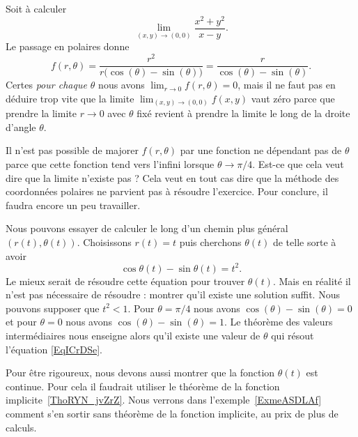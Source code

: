 \begin{example}     \label{EXooSDHDooJzDioW}
	Soit à calculer
	\begin{equation}
		\lim_{(x,y)\to(0,0)}\frac{ x^2+y^2 }{ x-y }.
	\end{equation}
	Le passage en polaires donne
	\begin{equation}
		f(r,\theta)=\frac{ r^2 }{ r\big( \cos(\theta)-\sin(\theta) \big) }=\frac{ r }{ \cos(\theta)-\sin(\theta) }.
	\end{equation}
	Certes \emph{pour chaque $\theta$} nous avons $\lim_{r\to 0} f(r,\theta)=0$, mais il ne faut pas en déduire trop vite que la limite $\lim_{(x,y)\to(0,0)}f(x,y)$ vaut zéro parce que prendre la limite $r\to 0$ avec $\theta$ fixé revient à prendre la limite le long de la droite d'angle $\theta$.

	Il n'est pas possible de majorer $f(r,\theta)$ par une fonction ne dépendant pas de $\theta$ parce que cette fonction tend vers l'infini lorsque $\theta\to\pi/4$. Est-ce que cela veut dire que la limite n'existe pas ? Cela veut en tout cas dire que la méthode des coordonnées polaires ne parvient pas à résoudre l'exercice. Pour conclure, il faudra encore un peu travailler.

    Nous pouvons essayer de calculer le long d'un chemin plus général \( (r(t),\theta(t))\). Choisissons \( r(t)=t\) puis cherchons \( \theta(t)\) de telle sorte à avoir
    \begin{equation}        \label{EqICrDSe}
        \cos\theta(t)-\sin\theta(t)=t^2.
    \end{equation}
    Le mieux serait de résoudre cette équation pour trouver \( \theta(t)\). Mais en réalité il n'est pas nécessaire de résoudre : montrer qu'il existe une solution suffit. Nous pouvons supposer que \( t^2<1\). Pour \( \theta=\pi/4\) nous avons \( \cos(\theta)-\sin(\theta)=0\) et pour \( \theta=0\) nous avons \( \cos(\theta)-\sin(\theta)=1\). Le théorème des valeurs intermédiaires nous enseigne alors qu'il existe une valeur de \( \theta\) qui résout l'équation \eqref{EqICrDSe}.

    Pour être rigoureux, nous devons aussi montrer que la fonction \( \theta(t)\) est continue. Pour cela il faudrait utiliser le théorème de la fonction implicite~\ref{ThoRYN_jvZrZ}.
    Nous verrons dans l'exemple~\ref{ExmeASDLAf} comment s'en sortir sans théorème de la fonction implicite, au prix de plus de calculs.
\end{example}


